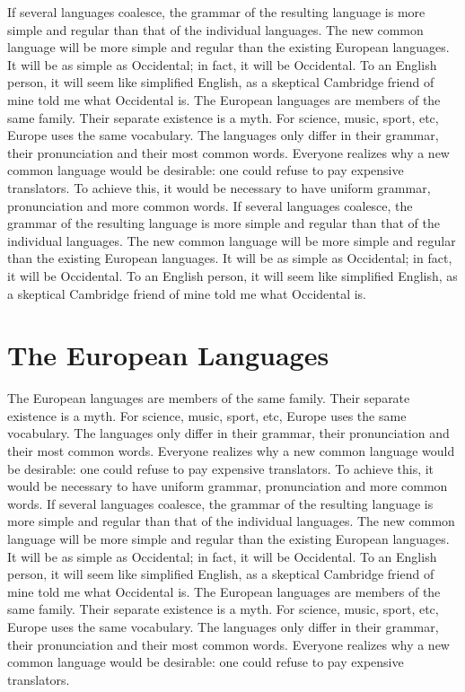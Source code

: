 If several languages coalesce, the grammar of the resulting language is more simple and regular than that of the individual languages. The new common language will be more simple and regular than the existing European languages. It will be as simple as Occidental; in fact, it will be Occidental. To an English person, it will seem like simplified English, as a skeptical Cambridge friend of mine told me what Occidental is. The European languages are members of the same family. Their separate existence is a myth. For science, music, sport, etc, Europe uses the same vocabulary. The languages only differ in their grammar, their pronunciation and their most common words. Everyone realizes why a new common language would be desirable: one could refuse to pay expensive translators. To achieve this, it would be necessary to have uniform grammar, pronunciation and more common words. If several languages coalesce, the grammar of the resulting language is more simple and regular than that of the individual languages. The new common language will be more simple and regular than the existing European languages. It will be as simple as Occidental; in fact, it will be Occidental. To an English person, it will seem like simplified English, as a skeptical Cambridge friend of mine told me what Occidental is.

\section{The European Languages}
\label{theeuropeanlanguages}

The European languages are members of the same family. Their separate existence is a myth. For science, music, sport, etc, Europe uses the same vocabulary. The languages only differ in their grammar, their pronunciation and their most common words. Everyone realizes why a new common language would be desirable: one could refuse to pay expensive translators. To achieve this, it would be necessary to have uniform grammar, pronunciation and more common words. If several languages coalesce, the grammar of the resulting language is more simple and regular than that of the individual languages. The new common language will be more simple and regular than the existing European languages. It will be as simple as Occidental; in fact, it will be Occidental. To an English person, it will seem like simplified English, as a skeptical Cambridge friend of mine told me what Occidental is. The European languages are members of the same family. Their separate existence is a myth. For science, music, sport, etc, Europe uses the same vocabulary. The languages only differ in their grammar, their pronunciation and their most common words. Everyone realizes why a new common language would be desirable: one could refuse to pay expensive translators.

